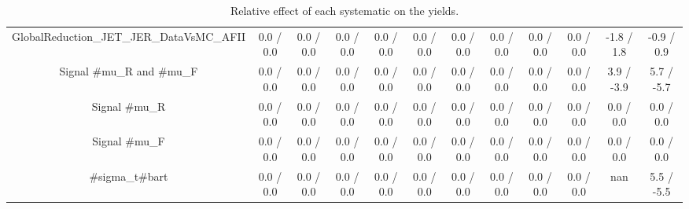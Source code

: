 \begin{table}[htbp]
\begin{center}
\begin{tabular}{|c|c|c|c|c|c|c|c|c|c|c|c|}
  GlobalReduction_JET_JER_DataVsMC_AFII & 0.0 / 0.0 & 0.0 / 0.0 & 0.0 / 0.0 & 0.0 / 0.0 & 0.0 / 0.0 & 0.0 / 0.0 & 0.0 / 0.0 & 0.0 / 0.0 & 0.0 / 0.0 & -1.8 / 1.8 & -0.9 / 0.9 \\ 
  Signal #mu_{R} and #mu_{F} & 0.0 / 0.0 & 0.0 / 0.0 & 0.0 / 0.0 & 0.0 / 0.0 & 0.0 / 0.0 & 0.0 / 0.0 & 0.0 / 0.0 & 0.0 / 0.0 & 0.0 / 0.0 & 3.9 / -3.9 & 5.7 / -5.7 \\ 
  Signal #mu_{R} & 0.0 / 0.0 & 0.0 / 0.0 & 0.0 / 0.0 & 0.0 / 0.0 & 0.0 / 0.0 & 0.0 / 0.0 & 0.0 / 0.0 & 0.0 / 0.0 & 0.0 / 0.0 & 0.0 / 0.0 & 0.0 / 0.0 \\ 
  Signal #mu_{F} & 0.0 / 0.0 & 0.0 / 0.0 & 0.0 / 0.0 & 0.0 / 0.0 & 0.0 / 0.0 & 0.0 / 0.0 & 0.0 / 0.0 & 0.0 / 0.0 & 0.0 / 0.0 & 0.0 / 0.0 & 0.0 / 0.0 \\ 
  #sigma_{t#bar{t}} & 0.0 / 0.0 & 0.0 / 0.0 & 0.0 / 0.0 & 0.0 / 0.0 & 0.0 / 0.0 & 0.0 / 0.0 & 0.0 / 0.0 & 0.0 / 0.0 & 0.0 / 0.0 &    nan    & 5.5 / -5.5 \\ 
\hline 
\end{tabular} 
\caption{Relative effect of each systematic on the yields.} 
\end{center} 
\end{table} 
